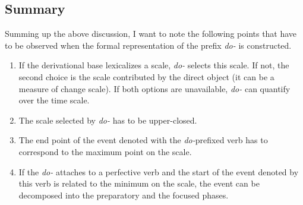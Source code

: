 \subsection{Summary}
Summing up the above discussion, I want to note the following points that have to be observed when the formal representation of the prefix \textit{do-} is constructed.
\begin{enumerate}
\item If the derivational base lexicalizes a scale, \textit{do-} selects this scale. If not, the second choice is the scale contributed by the direct object (it can be a measure of change scale). If both options are unavailable, \textit{do-} can quantify over the time scale.
\item The scale selected by \textit{do-} has to be upper-closed.
\item The end point of the event denoted with the \textit{do-}prefixed verb has to correspond to the maximum point on the scale.
\item If the \textit{do-} attaches to a perfective verb and the start of the event denoted by this verb is related to the minimum on the scale, the event can be decomposed into the preparatory and the focused phases.
\end{enumerate}

